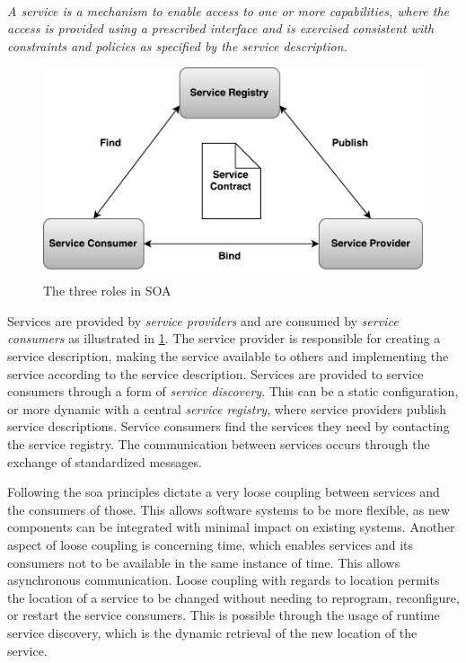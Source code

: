 \paragraph{}
\textit{
A service is a mechanism to enable access to one or more capabilities, where the
access is  provided using a prescribed interface and is exercised consistent
with constraints and policies as  specified by the service description.
}

\begin{figure}[h]
\includegraphics[scale=0.6]{images/SOA.pdf}
\caption{The three roles in SOA}
\label{figure-soa-roles}
\end{figure}

Services are provided by \textit{service providers} and are consumed by
\textit{service consumers} as illustrated in \cref{figure-soa-roles}. The
service provider is responsible for creating a service description, making the
service available to others and implementing the service according to the
service description. Services are provided to service consumers through a form
of \textit{service discovery}. This can be a static configuration, or more
dynamic with a central \textit{service registry}, where service providers
publish service descriptions. Service consumers find the services they need by
contacting the service registry. The communication between services occurs
through the exchange of standardized messages.

Following the \gls{soa} principles dictate a very loose coupling between
services and the consumers of those. This allows software systems to be more
flexible, as new components can be integrated with minimal impact on existing
systems. Another aspect of loose coupling is concerning time, which enables
services and its consumers not to be available in the same instance of time.
This allows asynchronous communication. Loose coupling with regards to location
permits the location of a service to be changed without needing to reprogram,
reconfigure, or restart the service consumers. This is possible through the
usage of runtime service discovery, which is the dynamic retrieval of the new
location of the service.

